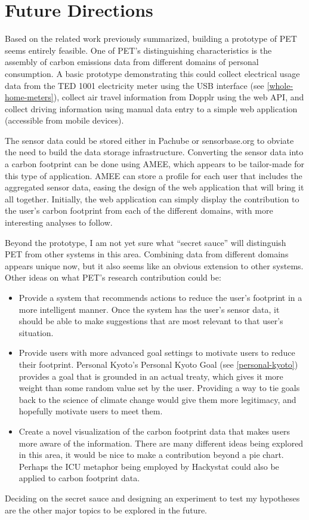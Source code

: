 \chapter{Future Directions}

Based on the related work previously summarized, building a prototype of PET seems entirely feasible. One of PET's distinguishing characteristics is the assembly of carbon emissions data from different domains of personal consumption. A basic prototype demonstrating this could collect electrical usage data from the TED 1001 electricity meter using the USB interface (see \autoref{whole-home-meters}), collect air travel information from Dopplr using the web API, and collect driving information using manual data entry to a simple web application (accessible from mobile devices).

The sensor data could be stored either in Pachube or sensorbase.org to obviate the need to build the data storage infrastructure. Converting the sensor data into a carbon footprint can be done using AMEE, which appears to be tailor-made for this type of application. AMEE can store a profile for each user that includes the aggregated sensor data, easing the design of the web application that will bring it all together. Initially, the web application can simply display the contribution to the user's carbon footprint from each of the different domains, with more interesting analyses to follow.

Beyond the prototype, I am not yet sure what ``secret sauce'' will distinguish PET from other systems in this area. Combining data from different domains appears unique now, but it also seems like an obvious extension to other systems. Other ideas on what PET's research contribution could be:

\begin{itemize}
	\item Provide a system that recommends actions to reduce the user's footprint in a more intelligent manner. Once the system has the user's sensor data, it should be able to make suggestions that are most relevant to that user's situation.
	\item Provide users with more advanced goal settings to motivate users to reduce their footprint. Personal Kyoto's Personal Kyoto Goal (see \autoref{personal-kyoto}) provides a goal that is grounded in an actual treaty, which gives it more weight than some random value set by the user. Providing a way to tie goals back to the science of climate change would give them more legitimacy, and hopefully motivate users to meet them.
	\item Create a novel visualization of the carbon footprint data that makes users more aware of the information. There are many different ideas being explored in this area, it would be nice to make a contribution beyond a pie chart. Perhaps the ICU metaphor being employed by Hackystat could also be applied to carbon footprint data.
\end{itemize}

Deciding on the secret sauce and designing an experiment to test my hypotheses are the other major topics to be explored in the future.